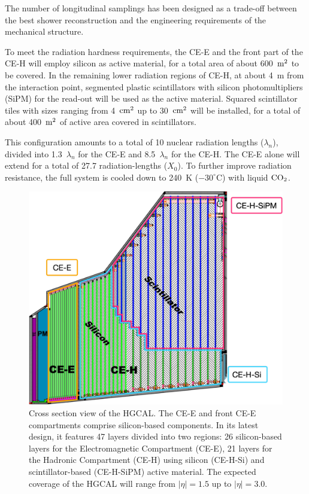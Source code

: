 The number of longitudinal samplings has been designed as a trade-off between the best shower reconstruction and the engineering requirements of the mechanical structure. 

To meet the radiation hardness requirements, the CE-E and the front part of the CE-H will employ silicon as active material, for a total area of about 600~$\textnormal{m}^2$ to be covered. In the remaining lower radiation regions of CE-H, at about 4~m from the interaction point, segmented plastic scintillators with silicon photomultipliers (SiPM) for the read-out will be used as the active material. Squared scintillator tiles with sizes ranging from 4~$\textnormal{cm}^2$ up to 30~$\textnormal{cm}^2$ will be installed, for a total of about 400~$\textnormal{m}^2$ of active area covered in scintillators.

This configuration amounts to a total of 10 nuclear radiation lengths ($\lambda_n$), divided into 1.3~$\lambda_n$ for the CE-E and 8.5~$\lambda_n$ for the CE-H. The CE-E alone will extend for a total of 27.7 radiation-lengths ($X_0$).
To further improve radiation resistance, the full system is cooled down to 240~K ($-30^{\circ}$C) with liquid $\textnormal{CO}_2$.

\begin{figure}
    \centering
    \includegraphics[width=0.6\linewidth]{Figures/HGCAL/HGCALLayers.pdf}
    \caption{Cross section view of the HGCAL. The CE-E and front CE-E compartments comprise silicon-based components. In its latest design, it features 47 layers divided into two regions: 26 silicon-based layers for the Electromagnetic Compartment (CE-E), 21 layers for the Hadronic Compartment (CE-H) using silicon (CE-H-Si) and scintillator-based (CE-H-SiPM) active material. The expected coverage of the HGCAL will range from $|\eta|=1.5$ up to $|\eta|=3.0$.}
    \label{fig:HGCALLayers}
\end{figure}

